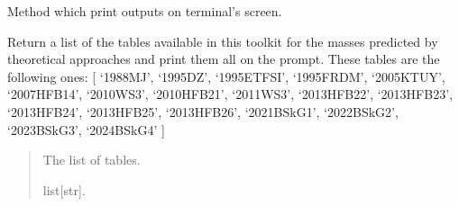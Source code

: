 \documentclass[letterpaper,10pt,english]{sphinxmanual}
\begin{document}
\begin{fulllineitems}
\begin{fulllineitems}
\end{fulllineitems}


\begin{fulllineitems}
\label{\detokenize{source/api/setup_nuc_be_theo:nucleardatapy.setup_nuc_be_theo.SetupNucBETheo.print_outputs}}
\pysigstartsignatures
\pysiglinewithargsret
{}
{}
{}
\pysigstopsignatures
\sphinxAtStartPar
Method which print outputs on terminal’s screen.

\end{fulllineitems}


\end{fulllineitems}


\begin{fulllineitems}
\label{\detokenize{source/api/setup_nuc_be_theo:nucleardatapy.setup_nuc_be_theo.nuc_be_theo_tables}}
\pysigstartsignatures
\pysiglinewithargsret
{}
{}
{}
\pysigstopsignatures
\sphinxAtStartPar
Return a list of the tables available in this toolkit for the masses
predicted by theoretical approaches and print them all on the prompt.
These tables are the following ones:     {[} ‘1988\sphinxhyphen{}MJ’, ‘1995\sphinxhyphen{}DZ’, ‘1995\sphinxhyphen{}ETFSI’, ‘1995\sphinxhyphen{}FRDM’,     ‘2005\sphinxhyphen{}KTUY’, ‘2007\sphinxhyphen{}HFB14’, ‘2010\sphinxhyphen{}WS3’, ‘2010\sphinxhyphen{}HFB21’, ‘2011\sphinxhyphen{}WS3’, ‘2013\sphinxhyphen{}HFB22’,     ‘2013\sphinxhyphen{}HFB23’, ‘2013\sphinxhyphen{}HFB24’, ‘2013\sphinxhyphen{}HFB25’, ‘2013\sphinxhyphen{}HFB26’, ‘2021\sphinxhyphen{}BSkG1’,     ‘2022\sphinxhyphen{}BSkG2’, ‘2023\sphinxhyphen{}BSkG3’, ‘2024\sphinxhyphen{}BSkG4’ {]}
\begin{quote}\begin{description}
\sphinxAtStartPar
The list of tables.

\sphinxAtStartPar
list{[}str{]}.

\end{description}\end{quote}

\end{fulllineitems}
\end{document}
